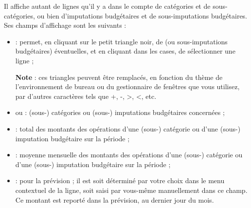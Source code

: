 Il affiche autant de lignes qu'il y a dans le compte de catégories et de sous-catégories, ou bien d'imputations budgétaires et de sous-imputations budgétaires. Ses champs d'affichage sont les suivants :
\begin{itemize}
	\item{} : permet, en cliquant sur le petit triangle noir, de  (ou sous-imputations budgétaires) éventuelles, et en cliquant dans les cases, de sélectionner une ligne ; 

	\textbf{Note} : ces triangles peuvent être remplacés, en fonction du thème de l'environnement de bureau ou du gestionnaire de fenêtres que vous utilisez, par d'autres caractères tels que +, -, >, <, etc.
	
	\item {} ou  : (sous-) catégories ou (sous-) imputations budgétaires concernées ;
	\item {} : total des montants des opérations d'une (sous-) catégorie ou d'une (sous-) imputation budgétaire sur la période ;
	\item {} : moyenne mensuelle des montants des opérations d'une (sous-) catégorie ou d'une (sous-) imputation budgétaire sur la période ;
%
	\item {} :  pour la prévision ; il est soit déterminé par votre choix dans le menu contextuel de la ligne, soit saisi par vous-même manuellement dans ce champ. Ce montant est reporté dans la prévision, au dernier jour du mois.
\end{itemize}
 

